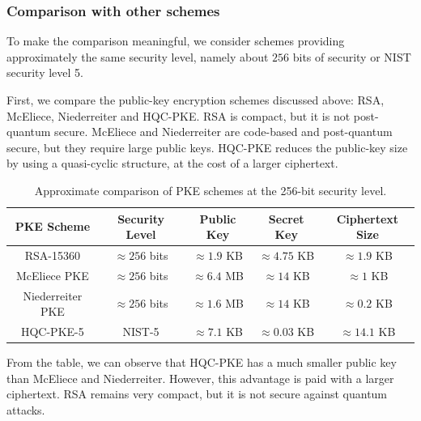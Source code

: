 \subsubsection{Comparison with other schemes}

To make the comparison meaningful, we consider schemes providing approximately 
the same security level, namely about \(256\) bits of security or NIST security 
level 5.

\medskip

\noindent
First, we compare the public-key encryption schemes discussed above: RSA, 
McEliece, Niederreiter and HQC-PKE. RSA is compact, but it is not post-quantum 
secure. McEliece and Niederreiter are code-based and post-quantum secure, but 
they require large public keys. HQC-PKE reduces the public-key size by using a 
quasi-cyclic structure, at the cost of a larger ciphertext.

\begin{table}[H]
\centering
\small
\renewcommand{\arraystretch}{1.35}
\begin{tabular}{|c|c|c|c|c|}
\hline
\rowcolor{gray!20}
\textbf{PKE Scheme} & \textbf{Security Level} & \textbf{Public Key} & \textbf{Secret Key} & \textbf{Ciphertext Size} \\
\hline

RSA-15360 & \(\approx 256\) bits & \(\approx 1.9\) KB & \(\approx 4.75\) KB & \(\approx 1.9\) KB \\
\hline

McEliece PKE & \(\approx 256\) bits & \(\approx 6.4\) MB & \(\approx 14\) KB & \(\approx 1\) KB \\
\hline

Niederreiter PKE & \(\approx 256\) bits & \(\approx 1.6\) MB & \(\approx 14\) KB & \(\approx 0.2\) KB \\
\hline

HQC-PKE-5 & NIST-5 & \(\approx 7.1\) KB & \(\approx 0.03\) KB & \(\approx 14.1\) KB \\
\hline

\end{tabular}
\caption{Approximate comparison of PKE schemes at the 256-bit security level.}
\label{tab:pke_comparison_256}
\end{table}

\medskip

\noindent
From the table, we can observe that HQC-PKE has a much smaller public key than 
McEliece and Niederreiter. However, this advantage is paid with a larger 
ciphertext. RSA remains very compact, but it is not secure against quantum 
attacks.

